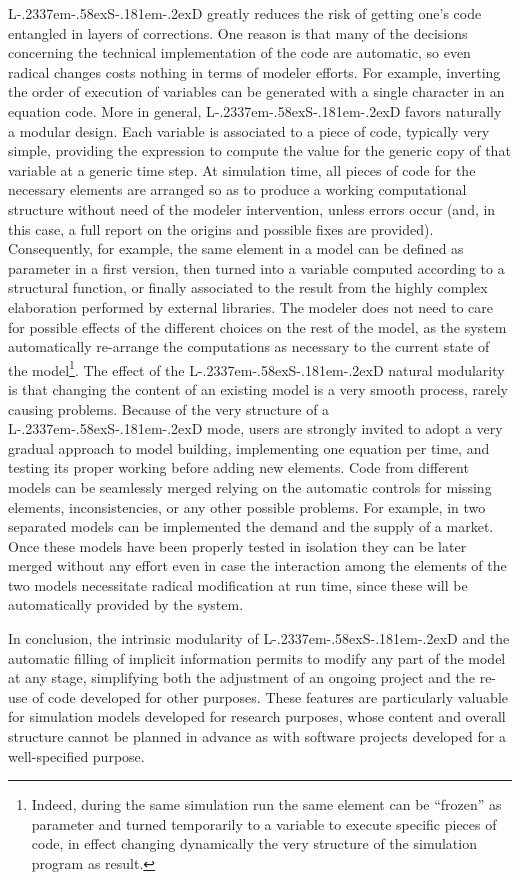 \documentclass [11pt,a4paper] {book}
\def\LsD{{L\kern-.2337em\lower-.58ex\hbox{S}\kern-.181em\lower-.2ex\hbox{D}}\xspace}
\begin{document}
\LsD greatly reduces the risk of getting one's code entangled in layers of corrections. One reason is that many of the decisions concerning the technical implementation of the code are automatic, so even radical changes costs nothing in terms of modeler efforts.  For example, inverting the order of execution of variables can be generated with a single character in an equation code. More in general, \LsD favors naturally a modular design. Each variable is associated to a piece of code, typically very simple, providing the expression to compute the value for the generic copy of that variable at a generic time step. At simulation time, all pieces of code for the necessary elements are arranged so as to produce a working computational structure without need of the modeler intervention, unless errors occur (and, in this case, a full report on the origins and possible fixes are provided).  Consequently, for example, the same element in a model can be defined as parameter in a first version, then turned into a variable computed according to a structural function, or finally associated to the result from the highly complex elaboration performed by external libraries. The modeler does not need to care for possible effects of the different choices on the rest of the model, as the system automatically re-arrange the computations as necessary to the current state of the model\footnote{Indeed, during the same simulation run the same element can be ``frozen'' as parameter and turned temporarily to a variable to execute specific pieces of code, in effect changing dynamically the very structure of the simulation program as result.}. The effect of the \LsD natural modularity is that changing the content of an existing model is a very smooth process, rarely causing problems. Because of the very structure of a \LsD mode, users are strongly invited to adopt a very gradual approach to model building, implementing one equation per time, and testing its proper working before adding new elements. Code from different models can be seamlessly merged relying on the automatic controls for missing elements, inconsistencies, or any other possible problems. For example, in two separated models can be implemented the demand and the supply of a market. Once these models have been properly tested in isolation they can be later merged without any effort even in case the interaction among the elements of the two models necessitate radical modification at run time, since these will be automatically provided by the system.

In conclusion, the intrinsic modularity of \LsD and the automatic filling of implicit information permits to modify any part of the model at any stage, simplifying both the adjustment of an ongoing project and the re-use of code developed for other purposes.  These features are particularly valuable for simulation models developed for research purposes, whose content and overall structure cannot be planned in advance as with software projects developed for a well-specified purpose.
\end{document}
